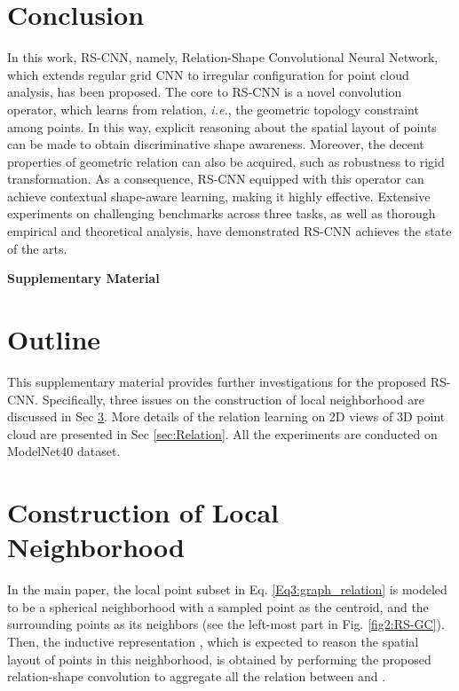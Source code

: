 \documentclass[10pt,twocolumn,letterpaper]{article}
\begin{document}
 \vspace{10pt}
\section{Conclusion}
\label{sec:conclusion}
\vspace{10pt}
In this work, RS-CNN, namely, Relation-Shape Convolutional Neural Network, which extends regular grid CNN to irregular configuration for point cloud analysis, has been proposed.
The core to RS-CNN is a novel convolution operator, which learns from relation, \textit{i.e.}, the geometric topology constraint among points.
In this way, explicit reasoning about the spatial layout of points can be made to obtain discriminative shape awareness.
Moreover, the decent properties of geometric relation can also be acquired, such as robustness to rigid transformation.
As a consequence, RS-CNN equipped with this operator can achieve contextual shape-aware learning, making it highly effective.
Extensive experiments on challenging benchmarks across three tasks, as well as thorough empirical and theoretical analysis, have demonstrated RS-CNN achieves the state of the arts.


 

\newpage
{\small


}

\newpage
\renewcommand\thesection{\Alph{section}}
\setcounter{section}{0}
{\Large \hspace{0.9cm} \textbf{Supplementary Material}}

\section{Outline}
\label{sec:Outline}
This supplementary material provides further investigations for the proposed RS-CNN. Specifically, three issues on the construction of local neighborhood are discussed in Sec \ref{sec:Neighborhood}. More details of the relation learning on 2D views of 3D point cloud are presented in Sec \ref{sec:Relation}. All the experiments are conducted on ModelNet40 dataset.  
\section{Construction of Local Neighborhood}
\label{sec:Neighborhood}
In the main paper, the local point subset  in Eq. \eqref{Eq3:graph_relation} is modeled to be a spherical neighborhood with a sampled point  as the centroid, and the surrounding points as its neighbors  (see the left-most part in Fig. \ref{fig2:RS-GC}). Then, the inductive representation , which is expected to reason the spatial layout of points in this neighborhood, is obtained by performing the proposed relation-shape convolution to aggregate all the relation between  and .
\end{document}
